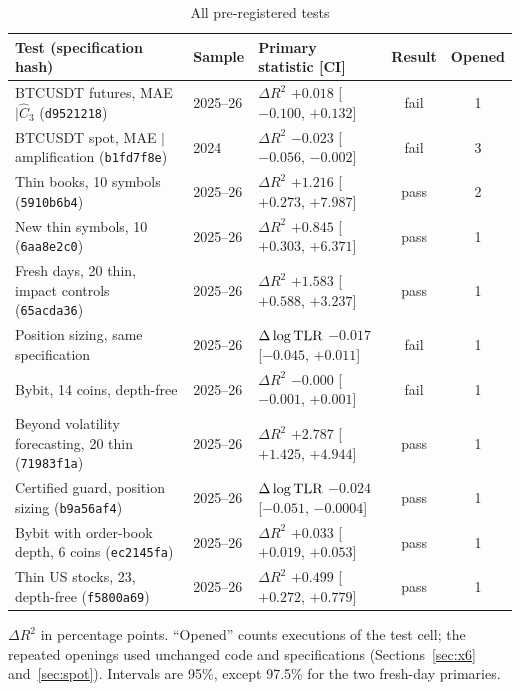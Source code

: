 \documentclass[12pt]{article}
\theoremstyle{definition}
\theoremstyle{remark}
\begin{document}
\begin{table}[t]\centering\small
\begin{threeparttable}
\caption{All pre-registered tests}\label{tab:alltests}
\setlength{\tabcolsep}{3pt}
\begin{tabular}{p{}lp{}cc}
\toprule
Test (specification hash) & Sample & Primary statistic [CI] & Result & Opened\\
\midrule
BTCUSDT futures, MAE $\mid\hat C_3$ (\texttt{d9521218}) & 2025--26 & $\Delta R^2$ $+0.018$ [$-0.100$, $+0.132$] & fail & 1\\
BTCUSDT spot, MAE $\mid$ amplification (\texttt{b1fd7f8e}) & 2024 & $\Delta R^2$ $-0.023$ [$-0.056$, $-0.002$] & fail & 3\\
Thin books, 10 symbols (\texttt{5910b6b4}) & 2025--26 & $\Delta R^2$ $+1.216$ [$+0.273$, $+7.987$] & pass & 2\\
New thin symbols, 10 (\texttt{6aa8e2c0}) & 2025--26 & $\Delta R^2$ $+0.845$ [$+0.303$, $+6.371$] & pass & 1\\
Fresh days, 20 thin, impact controls (\texttt{65acda36}) & 2025--26 & $\Delta R^2$ $+1.583$ [$+0.588$, $+3.237$] & pass & 1\\
Position sizing, same specification & 2025--26 & $\Delta\log{\rm TLR}$ $-0.017$ [$-0.045$, $+0.011$] & fail & 1\\
Bybit, 14 coins, depth-free & 2025--26 & $\Delta R^2$ $-0.000$ [$-0.001$, $+0.001$] & fail & 1\\
Beyond volatility forecasting, 20 thin (\texttt{71983f1a}) & 2025--26 & $\Delta R^2$ $+2.787$ [$+1.425$, $+4.944$] & pass & 1\\
Certified guard, position sizing (\texttt{b9a56af4}) & 2025--26 & $\Delta\log{\rm TLR}$ $-0.024$ [$-0.051$, $-0.0004$] & pass & 1\\
Bybit with order-book depth, 6 coins (\texttt{ec2145fa}) & 2025--26 & $\Delta R^2$ $+0.033$ [$+0.019$, $+0.053$] & pass & 1\\
Thin US stocks, 23, depth-free (\texttt{f5800a69}) & 2025--26 & $\Delta R^2$ $+0.499$ [$+0.272$, $+0.779$] & pass & 1\\
\bottomrule
\end{tabular}
\begin{tablenotes}\footnotesize\item $\Delta R^2$ in percentage points. ``Opened'' counts executions of the test cell; the repeated openings used unchanged code and specifications (Sections~\ref{sec:x6} and~\ref{sec:spot}). Intervals are 95\%, except 97.5\% for the two fresh-day primaries. \end{tablenotes}
\end{threeparttable}
\end{table}
\end{document}
